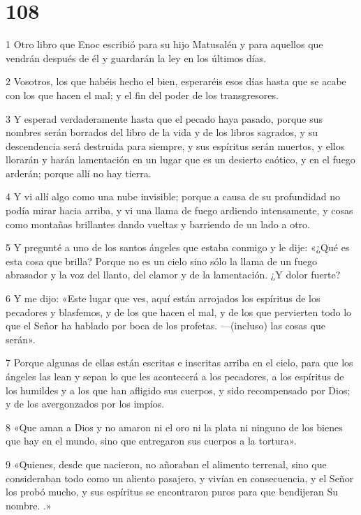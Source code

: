 \chapter{108}

\par 1 Otro libro que Enoc escribió para su hijo Matusalén y para aquellos que vendrán después de él y guardarán la ley en los últimos días.
\par 2 Vosotros, los que habéis hecho el bien, esperaréis esos días hasta que se acabe con los que hacen el mal; y el fin del poder de los transgresores.
\par 3 Y esperad verdaderamente hasta que el pecado haya pasado, porque sus nombres serán borrados del libro de la vida y de los libros sagrados, y su descendencia será destruida para siempre, y sus espíritus serán muertos, y ellos llorarán y harán lamentación en un lugar que es un desierto caótico, y en el fuego arderán; porque allí no hay tierra.
\par 4 Y vi allí algo como una nube invisible; porque a causa de su profundidad no podía mirar hacia arriba, y vi una llama de fuego ardiendo intensamente, y cosas como montañas brillantes dando vueltas y barriendo de un lado a otro.
\par 5 Y pregunté a uno de los santos ángeles que estaba conmigo y le dije: «¿Qué es esta cosa que brilla? Porque no es un cielo sino sólo la llama de un fuego abrasador y la voz del llanto, del clamor y de la lamentación. ¿Y dolor fuerte?
\par 6 Y me dijo: «Este lugar que ves, aquí están arrojados los espíritus de los pecadores y blasfemos, y de los que hacen el mal, y de los que pervierten todo lo que el Señor ha hablado por boca de los profetas. —(incluso) las cosas que serán».
\par 7 Porque algunas de ellas están escritas e inscritas arriba en el cielo, para que los ángeles las lean y sepan lo que les acontecerá a los pecadores, a los espíritus de los humildes y a los que han afligido sus cuerpos, y sido recompensado por Dios; y de los avergonzados por los impíos.
\par 8 «Que aman a Dios y no amaron ni el oro ni la plata ni ninguno de los bienes que hay en el mundo, sino que entregaron sus cuerpos a la tortura».
\par 9 «Quienes, desde que nacieron, no añoraban el alimento terrenal, sino que consideraban todo como un aliento pasajero, y vivían en consecuencia, y el Señor los probó mucho, y sus espíritus se encontraron puros para que bendijeran Su nombre. .»
